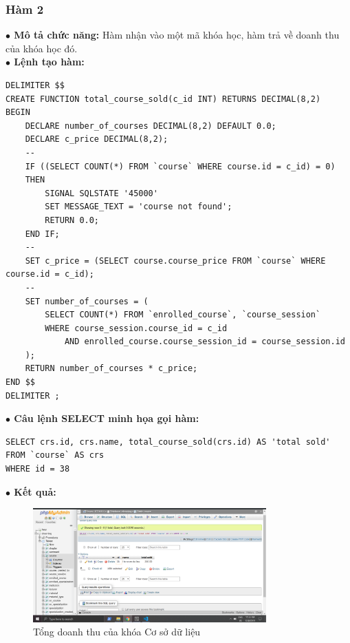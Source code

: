 \documentclass[12pt,a4paper,titlepage]{article}
\begin{document}
\subsubsection{Hàm 2}
\textbf{$\bullet$ Mô tả chức năng:} Hàm nhận vào một mã khóa học, hàm trả về doanh thu của khóa học đó.\\
\textbf{$\bullet$ Lệnh tạo hàm:}
\begin{lstlisting}
DELIMITER $$
CREATE FUNCTION total_course_sold(c_id INT) RETURNS DECIMAL(8,2)
BEGIN
    DECLARE number_of_courses DECIMAL(8,2) DEFAULT 0.0;
    DECLARE c_price DECIMAL(8,2);
    --
    IF ((SELECT COUNT(*) FROM `course` WHERE course.id = c_id) = 0)
    THEN
    	SIGNAL SQLSTATE '45000'
		SET MESSAGE_TEXT = 'course not found';
		RETURN 0.0;
    END IF;
    --
    SET c_price = (SELECT course.course_price FROM `course` WHERE course.id = c_id);
    --
    SET number_of_courses = (
        SELECT COUNT(*) FROM `enrolled_course`, `course_session`
        WHERE course_session.course_id = c_id
            AND enrolled_course.course_session_id = course_session.id
    );
    RETURN number_of_courses * c_price;
END $$
DELIMITER ;
\end{lstlisting}
\textbf{$\bullet$ Câu lệnh SELECT minh họa gọi hàm:}
\newpage
\begin{lstlisting}
SELECT crs.id, crs.name, total_course_sold(crs.id) AS 'total sold'
FROM `course` AS crs
WHERE id = 38
\end{lstlisting}
\textbf{$\bullet$ Kết quả:}
\begin{figure}[h!]
	\centering
	\caption{Tổng doanh thu của khóa Cơ sở dữ liệu}
	\includegraphics[width=0.8\textwidth]{images/course_sold.png}
\end{figure}
\end{document}
